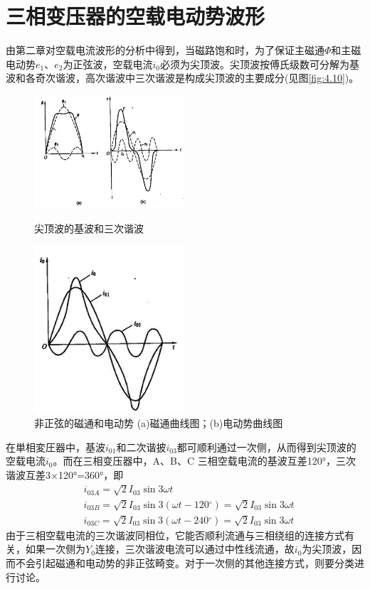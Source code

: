\documentclass{book}
\begin{document}
\section{三相变压器的空载电动势波形}

由第二章对空载电流波形的分析中得到，当磁路饱和时，为了保证主磁通$\Phi$和主磁电动势${{e}_{1}}$、${{e}_{2}}$为正弦波，空载电流${{i}_{0}}$必须为尖顶波。尖顶波按傅氏级数可分解为基波和各奇次谐波，高次谐波中三次谐波是构成尖顶波的主要成分(见图\ref{fig:4.10})。
\begin{figure}  
	\begin{minipage}[H]{0.45\linewidth}  
		\centering  
		\includegraphics[width=2.2in]{4-10.png}  
		\caption{尖顶波的基波和三次谐波}  
		\label{fig:4.10}  
	\end{minipage}
	\begin{minipage}[H]{0.45\linewidth}  
		\centering  
		\includegraphics[width=2.2in]{4-11.png}  
		\caption{非正弦的磁通和电动势
			(a)磁通曲线图；(b)电动势曲线图}  
		\label{fig:4.11}  
	\end{minipage}  
\end{figure}
在単相変圧器中，基波${{i}_{01}}$和二次谐披${{i}_{03}}$都可顺利通过一次侧，从而得到尖顶波的空载电流${{i}_{0}}$。而在三相变压器中，A、B、C 三相空载电流的基波互差120°，三次谐波互差3×120°=360°，即
\begin{align}
& {{i}_{03A}}=\sqrt{2}{{I}_{03}}\sin 3\omega t \\ 
& {{i}_{03B}}=\sqrt{2}{{I}_{03}}\sin 3\left( \omega t-120{}^\circ  \right)=\sqrt{2}{{I}_{03}}\sin 3\omega t \\ 
& {{i}_{03C}}=\sqrt{2}{{I}_{03}}\sin 3\left( \omega t-240{}^\circ  \right)=\sqrt{2}{{I}_{03}}\sin 3\omega t
\label{4-2}
\end{align}
由于三相空载电流的三次谐波同相位，它能否顺利流通与三相绕组的连接方式有关，如果一次侧为${{Y}_{0}}$连接，三次谐波电流可以通过中性线流通，故${{i}_{0}}$为尖顶波，因而不会引起磁通和电动势的非正弦畸变。对于一次侧的其他连接方式，则要分类进行讨论。
\end{document}
